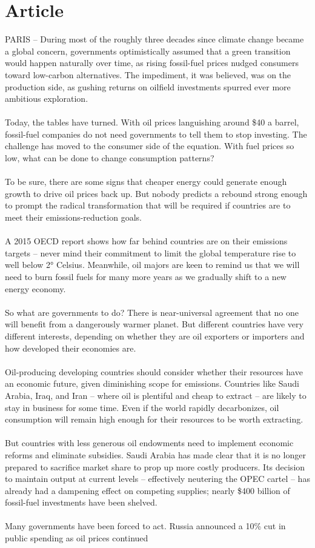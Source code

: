 \documentclass{article}
\begin{document}
\section{Article}
PARIS – During most of the roughly three decades since climate change became a global concern, governments optimistically assumed that a green transition would happen naturally over time, as rising fossil{-}fuel prices nudged consumers toward low{-}carbon alternatives. The impediment, it was believed, was on the production side, as gushing returns on oilfield investments spurred ever more ambitious exploration.\\\\Today, the tables have turned. With oil prices languishing around \$40 a barrel, fossil{-}fuel companies do not need governments to tell them to stop investing. The challenge has moved to the consumer side of the equation. With fuel prices so low, what can be done to change consumption patterns?\\\\To be sure, there are some signs that cheaper energy could generate enough growth to drive oil prices back up. But nobody predicts a rebound strong enough to prompt the radical transformation that will be required if countries are to meet their emissions{-}reduction goals.\\\\A 2015 OECD report shows how far behind countries are on their emissions targets – never mind their commitment to limit the global temperature rise to well below 2° Celsius. Meanwhile, oil majors are keen to remind us that we will need to burn fossil fuels for many more years as we gradually shift to a new energy economy.\\\\So what are governments to do? There is near{-}universal agreement that no one will benefit from a dangerously warmer planet. But different countries have very different interests, depending on whether they are oil exporters or importers and how developed their economies are.\\\\Oil{-}producing developing countries should consider whether their resources have an economic future, given diminishing scope for emissions. Countries like Saudi Arabia, Iraq, and Iran – where oil is plentiful and cheap to extract – are likely to stay in business for some time. Even if the world rapidly decarbonizes, oil consumption will remain high enough for their resources to be worth extracting.\\\\But countries with less generous oil endowments need to implement economic reforms and eliminate subsidies. Saudi Arabia has made clear that it is no longer prepared to sacrifice market share to prop up more costly producers. Its decision to maintain output at current levels – effectively neutering the OPEC cartel – has already had a dampening effect on competing supplies; nearly \$400 billion of fossil{-}fuel investments have been shelved.\\\\Many governments have been forced to act. Russia announced a 10\% cut in public spending as oil prices continued 
\end{document}

